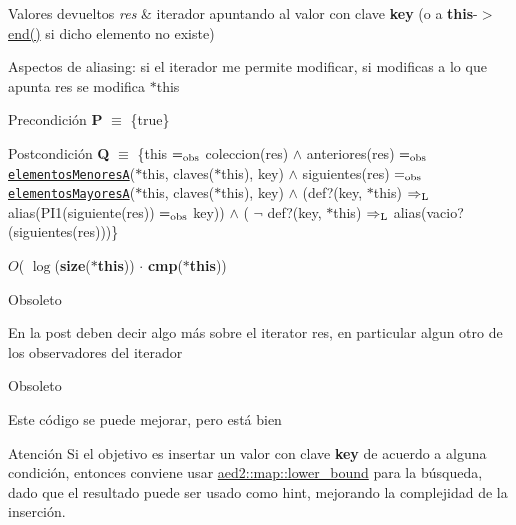 \begin{DoxyRetVals}{Valores devueltos}
{\em res} & iterador apuntando al valor con clave {\bfseries key} (o a {\bfseries this}-\/$>$\hyperlink{classaed2_1_1map_a76023e6a56cb625513e1b5ea028bf983_a76023e6a56cb625513e1b5ea028bf983}{end()} si dicho elemento no existe)\\
\hline
\end{DoxyRetVals}
\begin{DoxyParagraph}{Aspectos de aliasing\+:}
si el iterador me permite modificar, si modificas a lo que apunta res se modifica $\ast$this
\end{DoxyParagraph}
\begin{DoxyPrecond}{Precondición}
{\bfseries P} $\equiv$ \{true\} 
\end{DoxyPrecond}
\begin{DoxyPostcond}{Postcondición}
{\bfseries Q} $\equiv$ \{this $=_{\rm obs}$ coleccion(res) $\land$ anteriores(res) $=_{\rm obs}$ \href{axiomas.html#elementosMenoresA}{\tt elementos\+MenoresA}($\ast$this, claves($\ast$this), key) $\land$ siguientes(res) $=_{\rm obs}$ \href{axiomas.html#elementosMayoresA}{\tt elementos\+MayoresA}($\ast$this, claves($\ast$this), key) $\land$ (def?(key, $\ast$this) $\Rightarrow_{\rm L}$ alias(P\+I1(siguiente(res)) $=_{\rm obs}$ key)) $\land$ ( $\lnot$ def?(key, $\ast$this) $\Rightarrow_{\rm L}$ alias(vacio?(siguientes(res)))\}
\end{DoxyPostcond}

\begin{DoxyDescription}
\item[Complejidad Temporal]$O$( $\log$({\bfseries size}({\bfseries $\ast$this})) $\cdot$ {\bfseries cmp}({\bfseries $\ast$this}))
\end{DoxyDescription}

\begin{DoxyRefDesc}{Obsoleto}
\item[\hyperlink{deprecated__deprecated000008}{Obsoleto}]En la post deben decir algo más sobre el iterator res, en particular algun otro de los observadores del iterador\end{DoxyRefDesc}


\begin{DoxyRefDesc}{Obsoleto}
\item[\hyperlink{deprecated__deprecated000009}{Obsoleto}]Este código se puede mejorar, pero está bien\end{DoxyRefDesc}


\begin{DoxyAttention}{Atención}
Si el objetivo es insertar un valor con clave {\bfseries key} de acuerdo a alguna condición, entonces conviene usar \hyperlink{classaed2_1_1map_a3399d36fdd5a880b494f3a5795d3f18f_a3399d36fdd5a880b494f3a5795d3f18f}{aed2\+::map\+::lower\+\_\+bound} para la búsqueda, dado que el resultado puede ser usado como hint, mejorando la complejidad de la inserción. 
\end{DoxyAttention}


